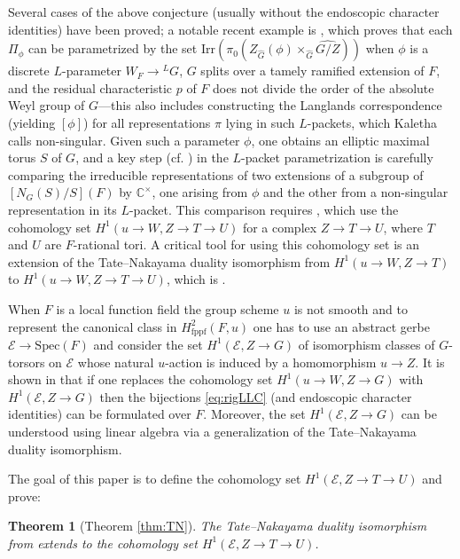 \documentclass{amsart}
\newtheorem{theorem}[result]{Theorem}
\theoremstyle{definition}
\theoremstyle{remark}
\newcommand\Spec{\mathrm{Spec}}
\begin{document}
Several cases of the above conjecture (usually without the endoscopic character identities) have been proved; a notable recent example is \cite{Kal22}, which proves that each $\Pi_{\phi}$ can be parametrized by the set $\text{Irr}(\pi_{0}(Z_{\widehat{G}}(\phi) \times_{\widehat{G}} \widehat{G/Z}))$ when $\phi$ is a discrete $L$-parameter $W_{F} \to {^{L}G}$, $G$ splits over a tamely ramified extension of $F$, and the residual characteristic $p$ of $F$ does not divide the order of the absolute Weyl group of $G$---this also includes constructing the Langlands correspondence (yielding $[\phi]$) for all representations $\pi$ lying in such $L$-packets, which Kaletha calls non-singular. Given such a parameter $\phi$, one obtains an elliptic maximal torus $S$ of $G$, and a key step (cf. \cite[\S 4.5]{Kal22}) in the $L$-packet parametrization is carefully comparing the irreducible representations of two extensions of a subgroup of $[N_{G}(S)/S](F)$ by $\mathbb{C}^{\times}$, one arising from $\phi$ and the other from a non-singular representation in its $L$-packet. This comparison requires \cite[Proposition 4.5.1, Lemma 4.5.8]{Kal22}, which use the cohomology set $H^{1}(u \to W, Z \to T \to U)$ for a complex $Z \to T \to U$, where $T$ and $U$ are $F$-rational tori. A critical tool for using this cohomology set is an extension of the Tate--Nakayama duality isomorphism \cite[Theorem 4.8]{kaletha16} from $H^{1}(u \to W, Z \to T)$ to $H^{1}(u \to W, Z \to T \to U)$, which is \cite[Proposition 5.7]{Kal26b}.

When $F$ is a local function field the group scheme $u$ is not smooth and to represent the canonical class in $H^{2}_{\text{fppf}}(F,u)$ one has to use an abstract gerbe $\mathcal{E} \to \Spec(F)$ and consider the set $H^{1}(\mathcal{E}, Z \to G)$ of isomorphism classes of $G$-torsors on $\mathcal{E}$ whose natural $u$-action is induced by a homomorphism $u \to Z$. It is shown in \cite{Dillery1} that if one replaces the cohomology set $H^{1}(u \to W, Z \to G)$ with $H^{1}(\mathcal{E}, Z \to G)$ then the bijections \eqref{eq:rigLLC} (and endoscopic character identities) can be formulated over $F$. Moreover, the set $H^{1}(\mathcal{E}, Z \to G)$ can be understood using linear algebra via a generalization \cite[Theorem 4.10, Theorem 5.10]{Dillery1} of the Tate--Nakayama duality isomorphism.

The goal of this paper is to define the cohomology set  $H^{1}(\mathcal{E}, Z \to T \to U)$ and prove:

\begin{theorem}[Theorem \ref{thm:TN}]\label{thm:intro} The Tate--Nakayama duality isomorphism from \cite[Theorem 4.10]{Dillery1} extends to the cohomology set $H^{1}(\mathcal{E}, Z \to T \to U)$.
\end{theorem}
\end{document}
